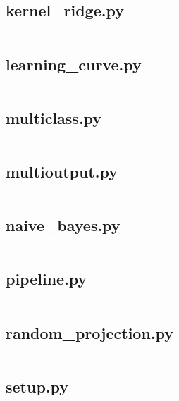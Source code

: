 \documentclass{article}
\begin{document}
\subsection{kernel\_ridge.py}
\inputminted{python}{/home/dufferzafar/dev/@clones/scikit-learn/sklearn/kernel_ridge.py}
\newpage

\subsection{learning\_curve.py}
\inputminted{python}{/home/dufferzafar/dev/@clones/scikit-learn/sklearn/learning_curve.py}
\newpage

\subsection{multiclass.py}
\inputminted{python}{/home/dufferzafar/dev/@clones/scikit-learn/sklearn/multiclass.py}
\newpage

\subsection{multioutput.py}
\inputminted{python}{/home/dufferzafar/dev/@clones/scikit-learn/sklearn/multioutput.py}
\newpage

\subsection{naive\_bayes.py}
\inputminted{python}{/home/dufferzafar/dev/@clones/scikit-learn/sklearn/naive_bayes.py}
\newpage

\subsection{pipeline.py}
\inputminted{python}{/home/dufferzafar/dev/@clones/scikit-learn/sklearn/pipeline.py}
\newpage

\subsection{random\_projection.py}
\inputminted{python}{/home/dufferzafar/dev/@clones/scikit-learn/sklearn/random_projection.py}
\newpage

\subsection{setup.py}
\inputminted{python}{/home/dufferzafar/dev/@clones/scikit-learn/sklearn/setup.py}
\newpage
\end{document}
